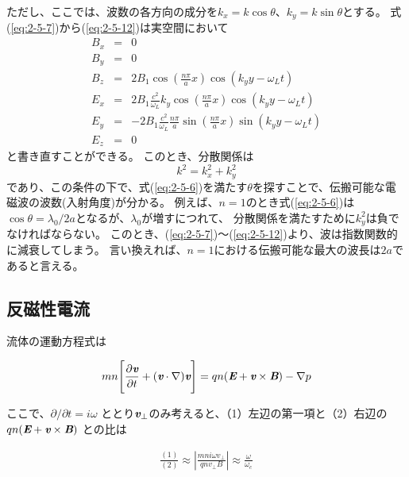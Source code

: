 \documentclass[a4paper,11pt,titlepage]{jarticle}
\numberwithin{equation}{section} %
\begin{document}
  ただし、ここでは、波数の各方向の成分を$k_x = k \cos \theta $、$k_y = k \sin \theta $とする。
  式(\ref{eq:2-5-7})から(\ref{eq:2-5-12})は実空間において
  \begin{eqnarray}
    \label{eq:2-5-13}
    B_x &=& 0  \\
    \label{eq:2-5-14}
    B_y &=& 0 \\
    \label{eq:2-5-15}
    B_z &=&  2 B_1 \cos ( \frac{n \pi}{a} x ) \cos \left( k_y y - \omega_L t  \right) \\
    \label{eq:2-5-16}
    E_x &=& 2 B_1 \frac{c^2}{\omega_L} k_y \cos( \frac{n\pi}{a} x ) \cos \left( k_y y - \omega_L t  \right) \\
    \label{eq:2-5-17}
    E_y &=& -2 B_1  \frac{c^2}{\omega_L} \frac{n\pi}{a} \sin ( \frac{n \pi}{a} x ) \sin \left( k_y y - \omega_L t  \right) \\
    \label{eq:2-5-18}
    E_z &=& 0
  \end{eqnarray}
  と書き直すことができる。
  このとき、分散関係は
  \begin{equation}
    \label{eq:2-5-19}
    k^2 = k_x^2 + k_y^2
  \end{equation}
  であり、この条件の下で、式(\ref{eq:2-5-6})を満たす$\theta$を探すことで、伝搬可能な電磁波の波数(入射角度)が分かる。
  例えば、$n=1$のとき式(\ref{eq:2-5-6})は$\cos \theta = \lambda_0 / 2 a $となるが、$\lambda_0$が増すにつれて、
  分散関係を満たすために$k_y^2$は負でなければならない。
  このとき、(\ref{eq:2-5-7})～(\ref{eq:2-5-12})より、波は指数関数的に減衰してしまう。
  言い換えれば、$n = 1$における伝搬可能な最大の波長は$2a$であると言える。

  \subsection{反磁性電流}

流体の運動方程式は

\begin{eqnarray}
  \label{eq:2-6-1}
  mn \Biggl[ \frac{\partial \textit{\textbf{v}} }{\partial t} + (\textit{\textbf{v}}  \cdot \nabla ) \textit{\textbf{v}} \Biggr] = qn (\textit{\textbf{E}} + \textit{\textbf{v}} \times \textit{\textbf{B}}) - \nabla p
\end{eqnarray}

ここで、$\partial / \partial t = i \omega$  ととり$\textit{\textbf{v}}_\perp$のみ考えると、（1）左辺の第一項と（2）右辺の$qn (\textit{\textbf{E}} + \textit{\textbf{v}} \times \textit{\textbf{B}})$ との比は

\begin{eqnarray}
  \frac{(1)}{(2)} \approx \left| \frac{mni \omega v_\perp}{qnv_\perp B} \right| \approx \frac{\omega}{\omega _c}
\end{eqnarray}
\end{document}
